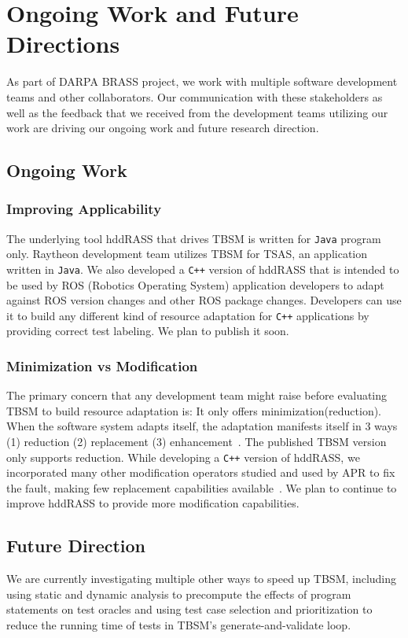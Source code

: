 \section{Ongoing Work and Future Directions}
As part of DARPA BRASS project, we work with multiple software development teams and other collaborators. Our communication with these stakeholders as well as the feedback that we received from the development teams utilizing our work are driving our ongoing work and future research direction. 
\subsection{Ongoing Work}
\subsubsection{Improving Applicability}
The underlying tool hddRASS that drives TBSM is written for \texttt{Java} program only. Raytheon development team utilizes TBSM for TSAS, an application written in \texttt{Java}. We also developed a \texttt{C++} version of hddRASS that is intended to be used by ROS (Robotics Operating System) application developers to adapt against ROS version changes and other ROS package changes.  Developers can use it to build any different kind of resource adaptation for \texttt{C++} applications by providing correct test labeling. We plan to publish it soon. 

\subsubsection{Minimization vs Modification}
The primary concern that any development team might raise before evaluating TBSM to build resource adaptation is: It only offers minimization(reduction). When the software system adapts itself, the adaptation manifests itself in 3 ways (1) reduction (2) replacement (3) enhancement~\cite{hughes2016building}. The published TBSM version only supports reduction. While developing a \texttt{C++} version of hddRASS, we incorporated many other modification operators studied and used by APR to fix the fault, making few replacement capabilities available~\cite{Forrest2009genetic,Arcuri2009phdthesis,Debroy2010using}. We plan to continue to improve hddRASS to provide more modification capabilities. 

\subsection{Future Direction}
We are currently investigating multiple other ways to speed up TBSM, including using static and dynamic analysis to precompute the effects of program statements on test oracles and using test case selection and prioritization to reduce the running time of tests in TBSM’s generate-and-validate loop.

